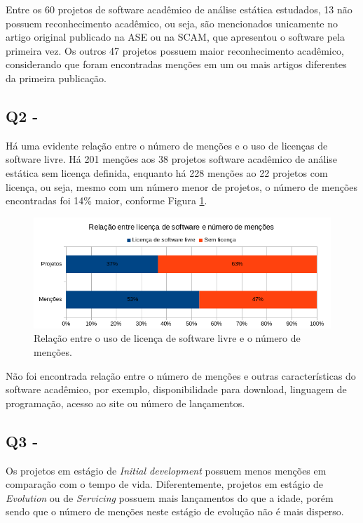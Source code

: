 Entre os 60 projetos de software acadêmico de análise estática estudados, 
13 não possuem reconhecimento acadêmico, ou seja, são
mencionados unicamente no artigo original publicado na ASE ou na SCAM,
que apresentou o software pela primeira vez. 
Os outros 47 projetos possuem maior reconhecimento acadêmico, 
considerando que foram encontradas menções em um ou mais artigos
diferentes da primeira publicação.


\subsection{Q2 - \QuestaoDois} %

Há uma evidente relação entre o número de menções e o uso de licenças de
software livre. 
Há 201 menções aos 38 projetos software acadêmico de análise estática sem licença definida, 
enquanto há 228 menções ao 22 projetos com licença, ou seja, 
mesmo com um número menor de projetos, o número de menções encontradas foi 14\% maior, 
conforme Figura \ref{license-vs-mentions}.

\begin{figure}[h]
  \center
  \includegraphics[scale=0.6]{imagens/license-vs-mentions.png}
  \caption{Relação entre o uso de licença de software livre e o número de menções.}
  \label{license-vs-mentions}
\end{figure}

Não foi encontrada relação entre o número de menções e 
outras características do software acadêmico, por exemplo,
disponibilidade para download, linguagem de programação, acesso ao site ou número
de lançamentos.

\subsection{Q3 - \QuestaoTres} %

Os projetos em estágio de {\it Initial development} possuem menos menções em %
comparação com o tempo de vida. 
Diferentemente, projetos em estágio de {\it Evolution} ou de {\it Servicing} 
possuem mais lançamentos do que a idade, porém
sendo que o número de menções neste estágio de evolução não é mais disperso. %

